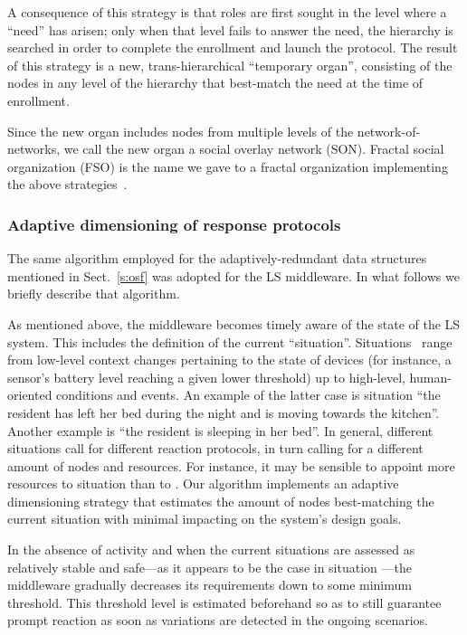 \documentclass[twocolumn]{svjour3}
\begin{document}
A consequence of this strategy is that roles are first sought in the level where a ``need'' has
arisen; only when that level fails to answer the need, the hierarchy is searched in order
to complete the enrollment and launch the protocol. The result of this strategy is a new,
trans-hierarchical ``temporary organ'', consisting of the nodes in any level of the hierarchy
that best-match the need at the time of enrollment.

Since the new organ includes nodes from multiple levels of the network-of-networks, we call the new
organ a
social overlay network (SON). Fractal social organization (FSO) is the name we gave to
a fractal organization implementing the above strategies~\cite{DF13c}.


\subsubsection{Adaptive dimensioning of response protocols}\label{sss:dtof}
The same algorithm employed for the adaptively-redundant 
data structures mentioned in Sect.~\ref{s:osf}
was adopted for the LS middleware. In what follows we briefly describe that algorithm.

As mentioned above, the middleware becomes timely aware of the state of the LS system.
This includes the definition of the current ``situation''.
Situations~\cite{YeDM12} range from low-level
context changes pertaining to the state of devices (for instance, a sensor's battery level reaching a
given lower threshold) up to high-level, human-oriented conditions and events.
An example of the latter case is
situation  ``the resident has left her bed during the night and is moving towards the kitchen''.
Another example is  ``the resident is sleeping in her bed''.
In general, different situations call for different reaction protocols, in turn calling for a different
amount of nodes and resources. For instance, it may be sensible to appoint more resources
to situation  than to .
Our algorithm implements
an adaptive dimensioning strategy that estimates the amount of
nodes best-matching the current situation with minimal impacting on the system's design goals.

In the absence of activity and when the current situations are assessed as relatively
stable and safe---as it appears to be the case in situation ---the
middleware gradually
decreases its requirements down to some minimum threshold. This threshold level is
estimated beforehand so as to still guarantee prompt reaction
as soon as variations are detected in the ongoing scenarios.
\end{document}
